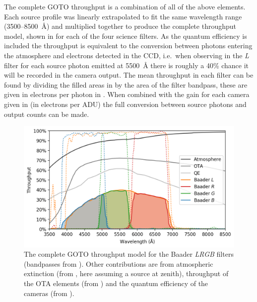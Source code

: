 \begin{colsection}
\begin{colsection}
The complete GOTO throughput is a combination of all of the above elements. Each source profile was linearly extrapolated to fit the same wavelength range (3500--\SI{8500}{\angstrom}) and multiplied together to produce the complete throughput model, shown in  for each of the four science filters. As the quantum efficiency is included the throughput is equivalent to the conversion between photons entering the atmosphere and electrons detected in the CCD, i.e.\ when observing in the \textit{L} filter for each source photon emitted at \SI{5500}{\angstrom} there is roughly a 40\% chance it will be recorded in the camera output. The mean throughput in each filter can be found by dividing the filled areas in  by the area of the filter bandpass, these are given in electrons per photon in . When combined with the gain for each camera given in  (in electrons per ADU) the full conversion between source photons and output counts can be made.

\begin{figure}[t]
    \begin{center}
        \includegraphics[width=\textwidth]{images/throughput/throughput.png}
    \end{center}
    \caption[Complete throughput model for the GOTO filters]{
        The complete GOTO throughput model for the Baader \textit{LRGB} filters (bandpasses from ). Other contributions are from atmospheric extinction (from , here assuming a source at zenith), throughput of the OTA elements (from ) and the quantum efficiency of the cameras (from ).
    }\label{fig:throughput}
\end{figure}


\end{colsection}
\end{colsection}

